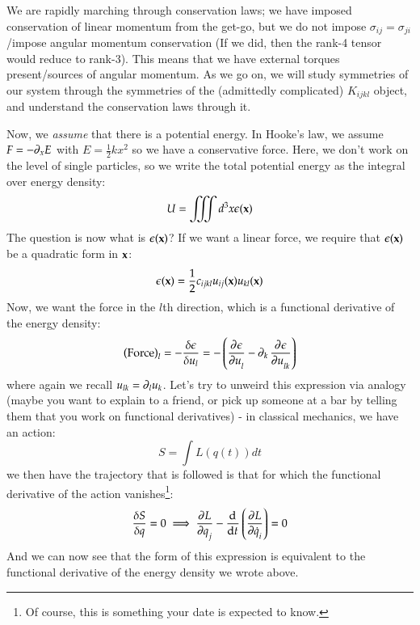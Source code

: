 We are rapidly marching through conservation laws; we have imposed conservation of linear momentum from the get-go, but we do not impose $\sigma_{ij} = \sigma_{ji}$/impose angular momentum conservation (If we did, then the rank-4 tensor would reduce to rank-3). This means that we have external torques present/sources of angular momentum. As we go on, we will study symmetries of our system through the symmetries of the (admittedly complicated) $K_{ijkl}$ object, and understand the conservation laws through it.

Now, we \emph{assume} that there is a potential energy. In Hooke's law, we assume $F = -\partial_x E$ with $E = \frac{1}{2}kx^2$ so we have a conservative force. Here, we don't work on the level of single particles, so we write the total potential energy as the integral over energy density:
\begin{equation}
    U = \iiint d^3x \epsilon(\mathbf{x})
\end{equation}
The question is now what is $\epsilon(\mathbf{x})$? If we want a linear force, we require that $\epsilon(\mathbf{x})$ be a quadratic form in $\mathbf{x}$:
\begin{equation}
    \epsilon(\mathbf{x}) = \frac{1}{2}c_{ijkl} u_{ij}(\mathbf{x})u_{kl}(\mathbf{x})
\end{equation}
Now, we want the force in the $l$th direction, which is a functional derivative of the energy density:
\begin{equation}
    \left(\text{Force}\right)_l = -\frac{\delta \e}{\delta u_l} = -\left(\dpd{\e}{u_l} - \p_k \dpd{\e}{u_{lk}}\right)
\end{equation}
where again we recall $u_{lk} = \partial_l u_k$. Let's try to unweird this expression via analogy (maybe you want to explain to a friend, or pick up someone at a bar by telling them that you work on functional derivatives) - in classical mechanics, we have an action:
\begin{equation}
    S = \int L(q(t))dt
\end{equation}
we then have the trajectory that is followed is that for which the functional derivative of the action vanishes\footnote{Of course, this is something your date is expected to know.}:
\begin{equation}
    \frac{\delta S}{\delta q} = 0 \implies \dpd{L}{q_j} - \dod{}{t}\left(\dpd{L}{\dot{q}_i}\right) = 0
\end{equation}
And we can now see that the form of this expression is equivalent to the functional derivative of the energy density we wrote above.

